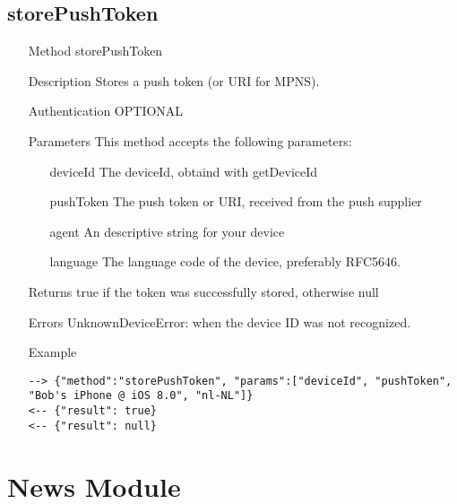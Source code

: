 \documentclass[a4paper]{scrreprt}
\begin{document}
\subsection{storePushToken}
\begin{enumerate}
\item[Method] storePushToken
\item[Description] Stores a push token (or URI for MPNS).
\item[Authentication] OPTIONAL
\item[Parameters] This method accepts the following parameters:
\begin{enumerate}
	\item[deviceId] The deviceId, obtaind with getDeviceId
  	\item[pushToken] The push token or URI, received from the push supplier
	\item[agent] An descriptive string for your device
	\item[language] The language code of the device, preferably RFC5646.
    \end{enumerate}
\item[Returns] true if the token was successfully stored, otherwise null
\item[Errors] UnknownDeviceError: when the device ID was not recognized.
\item[Example]
\begin{lstlisting}
--> {"method":"storePushToken", "params":["deviceId", "pushToken", "Bob's iPhone @ iOS 8.0", "nl-NL"]}
<-- {"result": true}
<-- {"result": null}
\end{lstlisting}
\end{enumerate}


\clearpage
\section{News Module}
\end{document}

